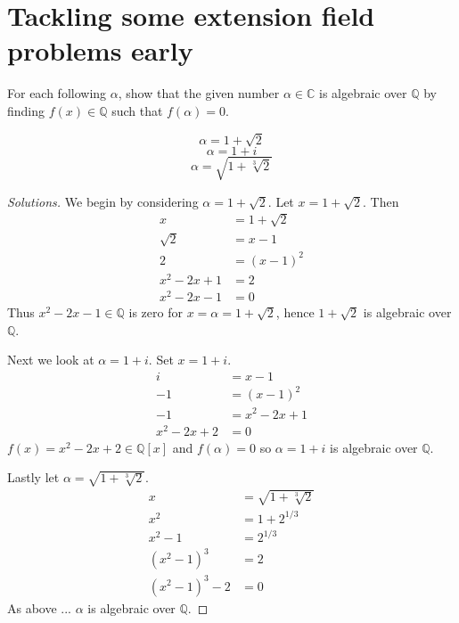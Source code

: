 \section{Tackling some extension field problems early}
\begin{prob}
    For each following $\alpha$, show that the given number 
    $\alpha \in \mathbb C$ is algebraic over $\mathbb Q$ by finding 
    $f(x) \in \mathbb Q$ such that $f(\alpha) = 0$. 

    \[
        \alpha = 1+\sqrt 2
    \]
    \[
        \alpha = 1+i
    \]
    \[
        \alpha = \sqrt{1+\sqrt[3]{2}}
    \]
\end{prob}
\begin{proof}[Solutions]
    We begin by considering $\alpha = 1+\sqrt 2$. 
    Let $x = 1+\sqrt 2$. Then 
    \begin{align*}
        x &= 1+\sqrt 2 \\
        \sqrt 2 &= x - 1 \\ 
        2 &= (x-1)^2 \\ 
        x^2 -2x + 1 &= 2 \\ 
        x^2 -2x - 1 &= 0
    \end{align*}
    Thus $x^2 - 2x - 1 \in \mathbb Q$ is zero for 
    $x = \alpha = 1 + \sqrt 2$, hence $1 + \sqrt 2$ is algebraic over
    $\mathbb Q$.

    Next we look at $\alpha = 1+i$.
    Set $x = 1+i$.
    \begin{align*}
        i &= x - 1 \\ 
        -1 &= (x-1)^2 \\ 
        -1 &= x^2 - 2x + 1 \\
        x^2 -2x +2 &= 0
    \end{align*}
    $f(x) = x^2 - 2x + 2 \in \mathbb Q[x]$ and 
    $f(\alpha) = 0$ so $\alpha = 1 + i$ is algebraic over 
    $\mathbb Q$.

    Lastly let $\alpha = \sqrt{1+\sqrt[3]{2}}$.
    \begin{align*}
        x &= \sqrt{1+\sqrt[3]{2}} \\ 
        x^2 &= 1 + 2^{1/3} \\ 
        x^2 - 1 &= 2^{1/3} \\ 
        (x^2-1)^3 &= 2 \\ 
        (x^2-1)^3 - 2 &= 0
    \end{align*}
    As above ... $\alpha$ is algebraic over $\mathbb Q$.
\end{proof}

